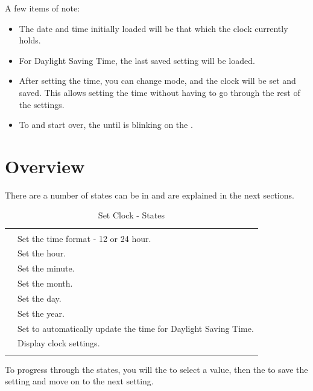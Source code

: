 \pagebreak
A few items of note:

\begin{itemize}
  \item The date and time initially loaded will be that which the clock
    currently holds.
  \item For Daylight Saving Time, the last saved setting will be loaded.
  \item After setting the time, you can change mode, 
    and the clock will be set and saved.  This allows setting the time
    without having to go through the rest of the settings.
  \item To  and start over,  the  until \symD{<<<<} is
    blinking on the .
\end{itemize}

\section{Overview}

There are a number of states  can be in and are explained in the next
sections.

\begin{table}[H]
\centering
\begin{tabu} { X[1,c,m] | X[3,l,m] }
  \thrule
   &  \\ \mrule

   & Set the time format - \num{12} or \num{24} hour. \\ 
   & Set the hour. \\ 
   & Set the minute. \\ 
   & Set the month. \\ 
   & Set the day. \\ 
   & Set the year. \\ 
   & Set to automatically update the time for Daylight Saving Time. \\ 
   & Display clock settings. \\
  \bhrule
\end{tabu}
\caption{Set Clock - States}
\end{table}

To progress through the states, you will  the  to select a value,
then  the  to save the setting and move on to the next setting.

